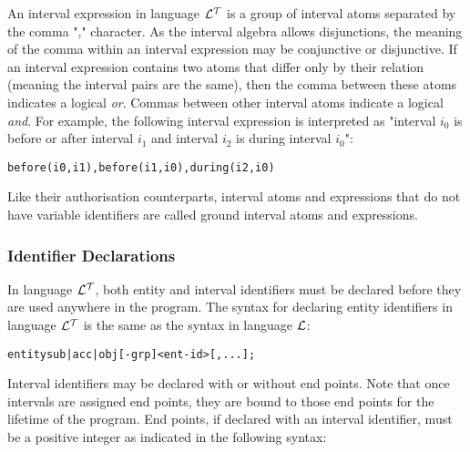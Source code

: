 \documentclass[11pt]{report}
\newenvironment{vverbatim}
{
  \begin{alltt}
}
{
  \vspace{-\baselineskip}
  \end{alltt}
}
\begin{document}
\begin{itemize}
              An interval expression in language ${\cal L^T}$ is a group
              of interval atoms separated by the comma "," character. As the
              interval algebra allows disjunctions, the meaning of the comma
              within an interval expression may be conjunctive or disjunctive.
              If an interval expression contains two atoms that differ only by
              their relation (meaning the interval pairs are the same), then
              the comma between these atoms indicates a logical {\em or}.
              Commas between other interval atoms indicate a logical {\em and}.
              For example, the following interval expression is interpreted as
              "interval $i_0$ is before or after interval $i_1$ and interval
              $i_2$ is during interval $i_0$":

              \begin{vverbatim}
  before(i0, i1), before(i1, i0), during(i2, i0)
              \end{vverbatim}

              Like their authorisation counterparts, interval atoms and
              expressions that do not have variable identifiers are called
              ground interval atoms and expressions.

          \end{itemize}

        \subsubsection{Identifier Declarations}

          In language ${\cal L^T}$, both entity and interval identifiers must
          be declared before they are used anywhere in the program. The syntax
          for declaring entity identifiers in language ${\cal L^T}$ is the same
          as the syntax in language ${\cal L}$:

          \begin{vverbatim}
  entity sub|acc|obj[-grp] <ent-id>[, ...];
          \end{vverbatim}

          Interval identifiers may be declared with or without end points. Note
          that once intervals are assigned end points, they are bound to those
          end points for the lifetime of the program. End points, if declared
          with an interval identifier, must be a positive integer as indicated
          in the following syntax:
\end{document}
